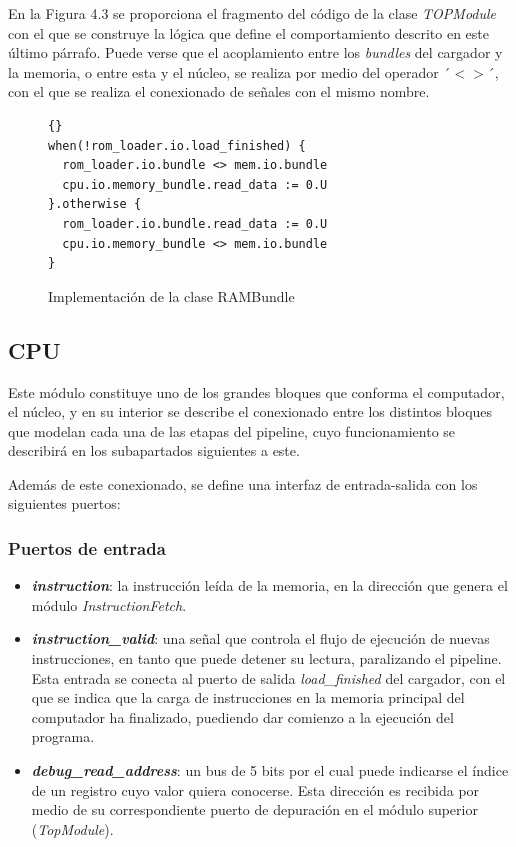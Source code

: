 En la Figura 4.3 se proporciona el fragmento del código de la clase \textit{TOPModule} con el que se construye la lógica que define el comportamiento descrito en este último párrafo. Puede verse que el acoplamiento entre los \textit{bundles} del cargador y la memoria, o entre esta y el núcleo, se realiza por medio del operador ´$<>$´, con el que se realiza el conexionado de señales con el mismo nombre.

\vspace{+0.3cm}
\begin{figure}[h]
  \centering
  \begin{minipage}{0.9\linewidth}
    \begin{lstlisting}[style=scalaStyle]{}
when(!rom_loader.io.load_finished) {
  rom_loader.io.bundle <> mem.io.bundle
  cpu.io.memory_bundle.read_data := 0.U
}.otherwise {
  rom_loader.io.bundle.read_data := 0.U
  cpu.io.memory_bundle <> mem.io.bundle
}
    \end{lstlisting}
    \caption{Implementación de la clase RAMBundle}
  \end{minipage}
\end{figure}

\subsection{CPU}

Este módulo constituye uno de los grandes bloques que conforma el computador, el núcleo, y en su interior se describe el conexionado entre los distintos bloques que modelan cada una de las etapas del pipeline, cuyo funcionamiento se describirá en los subapartados siguientes a este.

Además de este conexionado, se define una interfaz de entrada-salida con los siguientes puertos:

\subsubsection{Puertos de entrada}
\begin{itemize}
  \item \textbf{\textit{instruction}}: la instrucción leída de la memoria, en la dirección que genera el módulo \textit{InstructionFetch}.
  \vspace{-0.2cm}
  \item \textbf{\textit{instruction\_valid}}: una señal que controla el flujo de ejecución de nuevas instrucciones, en tanto que puede detener su lectura, paralizando el pipeline. Esta entrada se conecta al puerto de salida \textit{load\_finished} del cargador, con el que se indica que la carga de instrucciones en la memoria principal del computador ha finalizado, puediendo dar comienzo a la ejecución del programa.
  \vspace{-0.2cm}
  \item \textbf{\textit{debug\_read\_address}}: un bus de 5 bits por el cual puede indicarse el índice de un registro cuyo valor quiera conocerse. Esta dirección es recibida por medio de su correspondiente puerto de depuración en el módulo superior (\textit{TopModule}).
\end{itemize}

